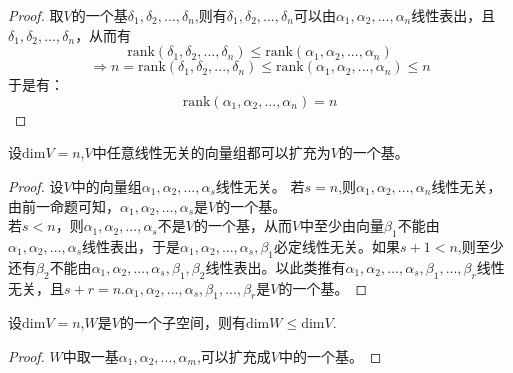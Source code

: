 \documentclass[blue,normal,cn]{elegantnote}
\begin{document}
\begin{proof}
    取$V$的一个基$δ_1,δ_2,...,δ_n$,则有$δ_1,δ_2,...,δ_n$可以由$α_1,α_2,...,α_n$线性表出，且$δ_1,δ_2,...,δ_n$，从而有
    $$
    \mathrm{rank}(δ_1,δ_2,...,δ_n)≤ \mathrm{rank}(α_1,α_2,...,α_n)
    $$
    $$
    \Rightarrow n=\mathrm{rank}(δ_1,δ_2,...,δ_n)≤ \mathrm{rank}(α_1,α_2,...,α_n) ≤n
    $$
    于是有：
    $$
     \mathrm{rank}(α_1,α_2,...,α_n) =n
    $$
\end{proof}

\begin{proposition}
    设$\mathrm{dim} V=n$,$V$中任意线性无关的向量组都可以扩充为$V$的一个基。
\end{proposition}

\begin{proof}
    设$V$中的向量组$α_1,α_2,...,α_s$线性无关。
    若$s=n$,则$α_1,α_2,...,α_n$线性无关，由前一命题可知，$α_1,α_2,...,α_s$是$V$的一个基。
    \\
    若$s<n$，则$α_1,α_2,...,α_s$不是$V$的一个基，从而$V$中至少由向量$β_1$不能由$α_1,α_2,...,α_s$线性表出，于是$α_1,α_2,...,α_s,β_1$必定线性无关。如果$s+1<n$,则至少还有$\beta_2$不能由$α_1,α_2,...,α_s,β_1,β_2$线性表出。以此类推有$α_1,α_2,...,α_s,β_1,...,β_r$线性无关，且$s+r=n$.$α_1,α_2,...,α_s,β_1,...,β_r$是$V$的一个基。
\end{proof}

\begin{proposition}
    设$\mathrm{dim} V=n$,$W$是$V$的一个子空间，则有$\mathrm{dim} W ≤ \mathrm{dim} V$.
\end{proposition}

\begin{proof}
    $W$中取一基$α_1,α_2,...,α_m$,可以扩充成$V$中的一个基。
\end{proof}
\end{document}
